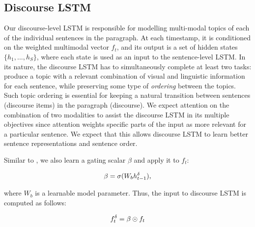 \documentclass[11pt,a4paper]{article}
\begin{document}


\subsection{Discourse LSTM}
Our discourse-level LSTM is responsible for modelling multi-modal topics of each of the individual sentences in the paragraph.
At each timestamp, it is conditioned on the weighted multimodal vector $f_t$, and its output is a set of hidden states $\{h_1, ..., h_S\}$, where each state is used as an input to the sentence-level LSTM.
In its nature, the discourse LSTM has to simultaneously complete at least two tasks: produce a topic with a relevant combination of visual and linguistic information for each sentence, while preserving some type of \textit{ordering} between the topics.
Such topic ordering is essential for keeping a natural transition between sentences (discourse items) in the paragraph (discourse).
We expect attention on the combination of two modalities to assist the discourse LSTM in its multiple objectives since attention weights specific parts of the input as more relevant for a particular sentence.
We expect that this allows discourse LSTM to learn better sentence representations and sentence order.

Similar to \cite{xu2015attend}, we also learn a gating scalar $\beta$ and apply it to $f_t$:

\begin{equation}
	\beta = \sigma(W_b h\sp{\delta}_{t-1}),
\end{equation}

where $W_b$ is a learnable model parameter.
Thus, the input to discourse LSTM is computed as follows:

\begin{equation}
	f_t\sp\delta = \beta \odot f_t
\end{equation}

\end{document}
